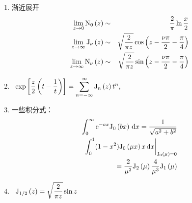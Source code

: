 \documentclass[12pt,a4paper]{article}
\newcommand\diff{\,\mathrm{d}}
\renewcommand{\[}{\ $\displaystyle}
\renewcommand{\]}{$\ }%
\newcommand\mi{\mathrm{i}}
\newcommand\e{\mathrm{e}}
\newcommand{\summ}[2][n]{\sum_{#1=#2}^\infty}
\begin{document}
\begin{enumerate}
	     \item 渐近展开
	     	\begin{eqnarray*}
	     	 \lim_{z\to 0}\fn[0]{z} &\sim & \frac{2}{\pi}\ln \frac x2\\
	     	 \lim_{z\to\infty}\fj{z} &\sim & \sqrt{\frac 2{\pi z}}\cos\left(z-\frac{\nu\pi}2 - \frac \pi 4\right) \\
	     	 \lim_{z\to\infty}\fn{z} &\sim & \sqrt{\frac 2{\pi z}}\sin\left(z-\frac{\nu\pi}2 - \frac \pi 4\right)
	     	\end{eqnarray*}
	     \item \[
	     	 	  \exp\left[\frac z2\left(t - \frac 1t\right)\right] = \summ{-\infty} \fj[n]{z}t^n, 
	     	 	\]
	     \item 一些积分式：
	     	\begin{eqnarray*}
	     	 \int_0^\infty \e^{-ax}\fj[0]{bx} \diff x = \frac{1}{\sqrt{a^2+b^2}} \\
	     	 \left.\int_0^1(1-x^2)\fj[0]{\mu x}x\diff x\right|_{\fj[0]{\mu} = 0} \\
	     	 = \frac{2}{\mu^2}\fj[2]{\mu} \frac{4}{\mu^3}\fj[1]{\mu}
	     	\end{eqnarray*}
	     \item \[
	     	  \fj[1/2]{z} = \sqrt{\frac 2{\pi z}}\sin z\]
	   \end{enumerate}
	   
   
\end{document}
